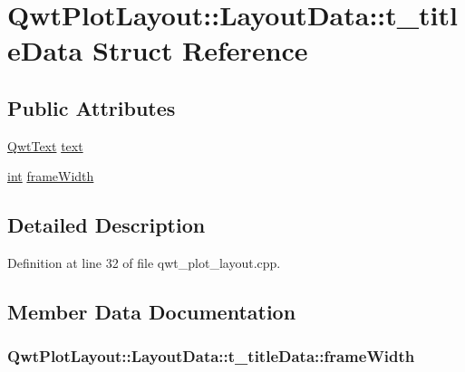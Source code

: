 \hypertarget{struct_qwt_plot_layout_1_1_layout_data_1_1t__title_data}{\section{Qwt\-Plot\-Layout\-:\-:Layout\-Data\-:\-:t\-\_\-title\-Data Struct Reference}
\label{struct_qwt_plot_layout_1_1_layout_data_1_1t__title_data}
}
\subsection*{Public Attributes}
\begin{DoxyCompactItemize}
\item 
\hyperlink{class_qwt_text}{Qwt\-Text} \hyperlink{struct_qwt_plot_layout_1_1_layout_data_1_1t__title_data_ab98445fdee569ffdee00ff87b6276d29}{text}
\item 
\hyperlink{ioapi_8h_a787fa3cf048117ba7123753c1e74fcd6}{int} \hyperlink{struct_qwt_plot_layout_1_1_layout_data_1_1t__title_data_a20aeb57b80683cd471eebf56b26f77cb}{frame\-Width}
\end{DoxyCompactItemize}


\subsection{Detailed Description}


Definition at line 32 of file qwt\-\_\-plot\-\_\-layout.\-cpp.



\subsection{Member Data Documentation}
\hypertarget{struct_qwt_plot_layout_1_1_layout_data_1_1t__title_data_a20aeb57b80683cd471eebf56b26f77cb}{
\subsubsection[{frame\-Width}]{ Qwt\-Plot\-Layout\-::\-Layout\-Data\-::t\-\_\-title\-Data\-::frame\-Width}}\label{struct_qwt_plot_layout_1_1_layout_data_1_1t__title_data_a20aeb57b80683cd471eebf56b26f77cb}


